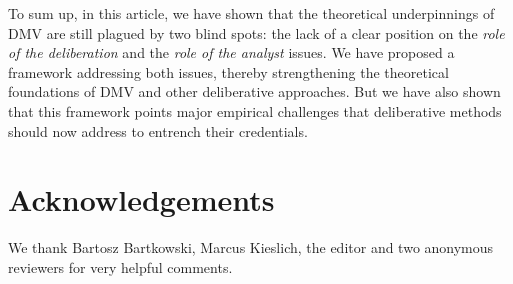 \documentclass[version=3.21, pagesize, twoside=off, bibliography=totoc, DIV=calc, fontsize=12pt, a4paper, french, english]{scrartcl}
\begin{document}
To sum up, in this article, we have shown that the theoretical underpinnings of \ac{DMV} are still plagued by two blind spots: the lack of a clear position on the \emph{role of the deliberation} and the \emph{role of the analyst} issues. We have proposed a framework addressing both issues, thereby strengthening the theoretical foundations of \ac{DMV} and other deliberative approaches.  But we have also shown that this framework points major empirical challenges that deliberative methods should now address to entrench their credentials.
 


\section*{Acknowledgements}
We thank Bartosz Bartkowski, Marcus Kieslich, the editor and two anonymous reviewers for very helpful comments.



\end{document}
